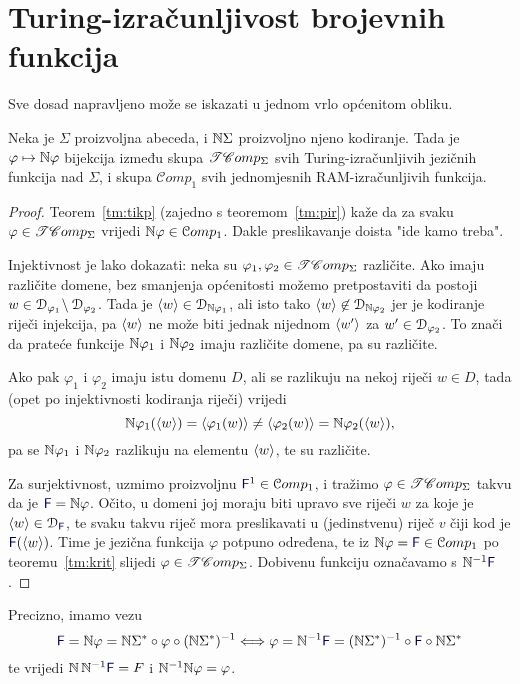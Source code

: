 \section{Turing-izračunljivost brojevnih funkcija}


Sve dosad napravljeno može se iskazati u jednom vrlo općenitom obliku.

\begin{propozicija}[{name=[izomorfizam skupova $\TComp$ i $\mathcal Comp_1$]}]\label{pp:trackbij}
Neka je $\Sigma$ proizvoljna abeceda, i ${\mathbb N}\Sigma$ proizvoljno njeno kodiranje. Tada je $\varphi\mapsto{\mathbb N}\varphi$ bijekcija između skupa $\TComp$ svih Turing-izračunljivih jezičnih funkcija nad $\Sigma$, i skupa $\mathcal Comp_1$ svih jednomjesnih RAM-izračunljivih funkcija.
\end{propozicija}

\begin{proof}
Teorem~\ref{tm:tikp} (zajedno s teoremom~\ref{tm:pir}) kaže da za svaku $\varphi\in\mathscr{TC}omp_\Sigma$ vrijedi ${\mathbb N}\varphi\in\mathcal Comp_1$. Dakle preslikavanje doista "ide kamo treba".

Injektivnost je lako dokazati: neka su $\varphi_1,\varphi_2\in\mathscr{TC}omp_\Sigma$ različite. Ako imaju različite domene, bez smanjenja općenitosti možemo pretpostaviti da postoji $w\in\mathcal D_{\varphi_1}\!\setminus\mathcal D_{\varphi_2}$. Tada je $\langle w\rangle\in\mathcal D_{{\mathbb N}\varphi_1}$, ali isto tako $\langle w\rangle\not\in\mathcal D_{{\mathbb N}\varphi_2}$ jer je kodiranje riječi injekcija, pa $\langle w\rangle$ ne može biti jednak nijednom $\langle w'\rangle$ za $w'\in\mathcal D_{\varphi_2}$. To znači da prateće funkcije ${\mathbb N}\varphi_1$ i ${\mathbb N}\varphi_2$ imaju različite domene, pa su različite.

Ako pak $\varphi_1$ i $\varphi_2$ imaju istu domenu $D$, ali se razlikuju na nekoj riječi $w\in D$, tada (opet po injektivnosti kodiranja riječi) vrijedi
\begin{equation}
    {\mathbb N}\varphi_1(\langle w\rangle)=\langle\varphi_1(w)\rangle\not=\langle\varphi_2(w)\rangle={\mathbb N}\varphi_2(\langle w\rangle)\text,
\end{equation}
pa se ${\mathbb N}\varphi_1$ i ${\mathbb N}\varphi_2$ razlikuju na elementu $\langle w\rangle$, te su različite.

Za surjektivnost, uzmimo proizvoljnu $\f F^1\in\mathcal Comp_1$, i tražimo $\varphi\in\mathscr{TC}omp_\Sigma$ takvu da je $\f F=\N\varphi$. Očito, u domeni joj moraju biti upravo sve riječi $w$ za koje je $\kr w\in\dom{\f F}$, te svaku takvu riječ mora preslikavati u (jedinstvenu) riječ $v$ čiji kod je $\f F(\kr w)$. Time je jezična funkcija $\varphi$ potpuno određena, te iz $\N\varphi=\f F\in\mathcal Comp_1$ po teoremu~\ref{tm:krit} slijedi $\varphi\in\mathscr{TC}omp_\Sigma$. Dobivenu funkciju označavamo s $\N^{-1}\f F$.
\end{proof}
Precizno, imamo vezu
\begin{equation}
\f F=\N\varphi=\N\Sigma^*\circ\varphi\circ(\N\Sigma^*)^{-1}\Longleftrightarrow
\varphi=\N^{-1}\f F=(\N\Sigma^*)^{-1}\circ\f F\circ\N\Sigma^*
\end{equation}
te vrijedi $\N\,\N^{-1}\f F=F$ i ${\mathbb N}^{-1}{\mathbb N}\varphi=\varphi$.

